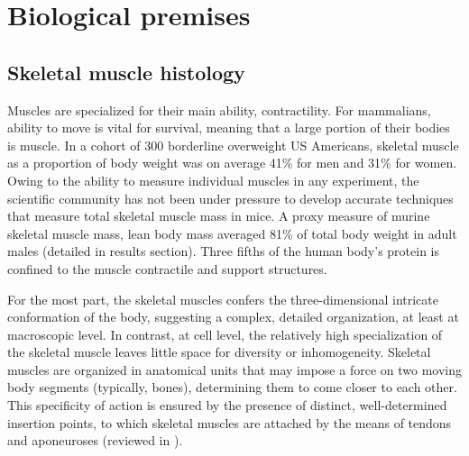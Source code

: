 \documentclass[12pt,english]{report}\usepackage[]{graphicx}\usepackage[]{color}
\begin{document}
\chapter{Biological premises}


\section{Skeletal muscle histology}

Muscles are specialized for their main ability, contractility. For
mammalians, ability to move is vital for survival, meaning that a
large portion of their bodies is muscle. In a cohort of 300 borderline
overweight US Americans, skeletal muscle as a proportion of body weight
was on average 41\% for men and 31\% for women\citep{wang2003whole-body}.
Owing to the ability to measure individual muscles in any experiment,
the scientific community has not been under pressure to develop accurate
techniques that measure total skeletal muscle mass in mice. A proxy
measure of murine skeletal muscle mass, lean body mass averaged 81\%
of total body weight in adult males (detailed in results section).
Three fifths of the human body's protein is confined to the muscle
contractile and support structures\citep{santilli2014clinical}.

For the most part, the skeletal muscles confers the three-dimensional
intricate conformation of the body, suggesting a complex, detailed
organization, at least at macroscopic level. In contrast, at cell
level, the relatively high specialization of the skeletal muscle leaves
little space for diversity or inhomogeneity. Skeletal muscles are
organized in anatomical units that may impose a force on two moving
body segments (typically, bones), determining them to come closer
to each other. This specificity of action is ensured by the presence
of distinct, well-determined insertion points, to which skeletal muscles
are attached by the means of tendons and aponeuroses (reviewed in
\citep{mescher2013junqueiras}).
\end{document}
